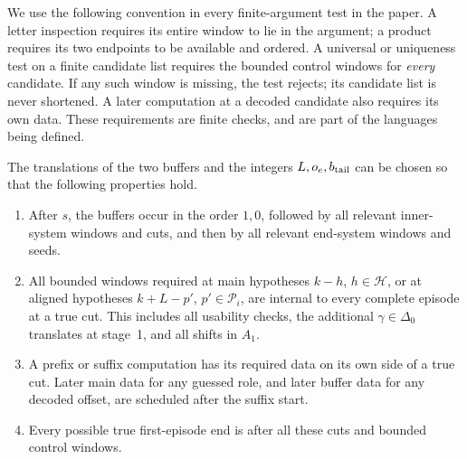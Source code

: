 We use the following convention in every finite-argument test in the
paper.  A letter inspection requires its entire window to lie in the
argument; a product requires its two endpoints to be available and
ordered.  A universal or uniqueness test on a finite candidate list
requires the bounded control windows for \emph{every} candidate.  If any
such window is missing, the test rejects; its candidate list is never
shortened.  A later computation at a decoded candidate also requires its
own data.  These requirements are finite checks, and are part of the
languages being defined.

\begin{lemma}[Placement]
\label{lem:placement}
The translations of the two buffers and the integers $L,o_e,b_{\rm tail}$
can be chosen so that the following properties hold.
\begin{enumerate}[label=\textup{(\roman*)}]
\item After $s$, the buffers occur in the order $1,0$, followed by all
relevant inner-system windows and cuts, and then by all relevant end-system
windows and seeds.
\item All bounded windows required at main hypotheses
$k-h$, $h\in\mathcal H$, or at aligned hypotheses
$k+L-p'$, $p'\in\mathcal P_i$, are internal to every complete episode
at a true cut.  This includes all usability checks, the additional
$\gamma\in\Delta_0$ translates at stage~1, and all shifts in $A_1$.
\item A prefix or suffix computation has its required data on its own
side of a true cut.  Later main data for any guessed role, and later
buffer data for any decoded offset, are scheduled after the suffix start.
\item Every possible true first-episode end is after all these cuts and
bounded control windows.
\end{enumerate}
\end{lemma}

